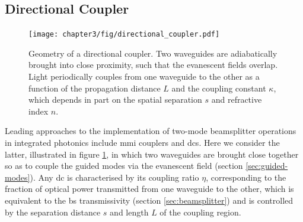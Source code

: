 \subsection{Directional Coupler} 
\label{sec:directional-coupler}
\begin{figure}[t!]
\centering
\texttt{[image: chapter3/fig/directional\_coupler.pdf]}
\caption[Directional coupler]
{Geometry of a directional coupler. Two waveguides are adiabatically brought into close proximity, such that the evanescent fields overlap. Light periodically couples from one waveguide to the other as a function of the propagation distance $L$ and the coupling constant $\kappa$, which depends in part on the spatial separation $s$ and refractive index $n$.}
\label{fig:directional-coupler}
\end{figure}
Leading approaches to the implementation of two-mode beamsplitter operations in integrated photonics include \gls{mmi} couplers and \glspl{dc}. Here we consider the latter, illustrated in figure \ref{fig:directional-coupler}, in which two waveguides are brought close together so as to couple the guided modes via the evanescent field (section \ref{sec:guided-modes}). Any \gls{dc} is characterised by its coupling ratio $\eta$, corresponding to the fraction of optical power transmitted from one waveguide to the other, which is equivalent to the \gls{bs} transmissivity (section \ref{sec:beamsplitter}) and is controlled by the separation distance $s$ and length $L$ of the coupling region.

